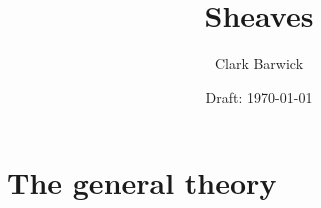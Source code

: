 \documentclass{cambridge7A}
\begin{document}

\author{Clark Barwick}
\title{Sheaves}
\date{Draft: \today}
\subtitle{}
\maketitle

\frontmatter

%
%
%
%

\setcounter{tocdepth}{2}
\tableofcontents

%

\mainmatter


\part{The general theory}%
\label{prt:the_general_theory}

\noindent 



% 

% 

% 

\end{document}
